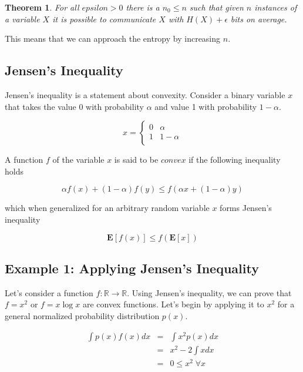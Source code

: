 \documentclass[a4paper,11pt]{book}
\newtheorem{theorem}{Theorem}
\begin{document}
\begin{theorem}
For all $epsilon > 0$ there is a $n_{0} \leq n$ such that given $n$ instances of a variable $X$ it is possible to communicate $X$ with $H(X) + \epsilon$ bits on average.
\end{theorem}

This means that we can approach the entropy by increasing $n$.


\subsection{Jensen's Inequality}

Jensen's inequality is a statement about convexity. Consider a binary variable $x$ that takes the value 0 with probability $\alpha$ and value 1 with probability $1-\alpha$.

\[x= \begin{cases} 
      0 & \alpha \\
      1 & 1-\alpha \\
   \end{cases}
\]

A function $f$ of the variable $x$ is said to be $\textit{convex}$ if the following inequality holds

\begin{equation*}
\alpha f(x) + (1-\alpha)f(y) \leq f(\alpha x + (1-\alpha)y)
\end{equation*}

which when generalized for an arbitrary random variable $x$ forms Jensen's inequality

\begin{equation}
\mathbf{E}[f(x)] \leq f(\mathbf{E}[x])
\end{equation}


\subsection{Example 1: Applying Jensen's Inequality}

Let's consider a function $f: \mathbb{R} \rightarrow \mathbb{R}$. Using Jensen's inequality, we can prove that $f=x^{2}$ or $f=x\log x$ are convex functions. Let's begin by applying it to $x^{2}$ for a general normalized probability distribution $p(x)$.

\begin{eqnarray*}
\int p(x)f(x)dx & = & \int x^{2}p(x)dx\\
&=& x^{2} - 2\int xdx\\
&=& 0 \leq x^{2} \; \forall x
\end{eqnarray*}
\end{document}

